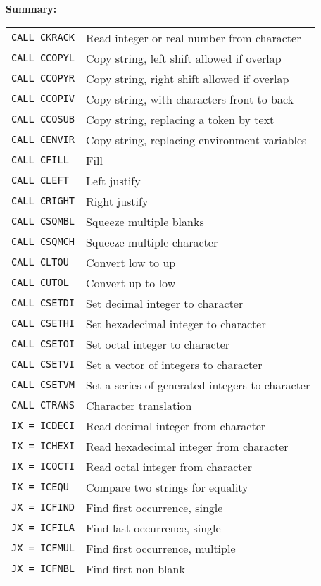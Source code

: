 {\bf Summary:}
\begin{tabular}[t]{l@{\qquad}l}
{\tt CALL CKRACK}  & Read integer or real number from character\\
{\tt CALL CCOPYL}  & Copy string, left shift allowed if overlap\\
{\tt CALL CCOPYR}  & Copy string, right shift allowed if overlap\\
{\tt CALL CCOPIV}  & Copy string, with characters front-to-back\\
{\tt CALL CCOSUB}  & Copy string, replacing a token by text\\
{\tt CALL CENVIR}  & Copy string, replacing environment variables\\
{\tt CALL CFILL}   & Fill\\
{\tt CALL CLEFT}   & Left justify\\
{\tt CALL CRIGHT}  & Right justify\\
{\tt CALL CSQMBL}  & Squeeze multiple blanks\\
{\tt CALL CSQMCH}  & Squeeze multiple character\\
{\tt CALL CLTOU}   & Convert low to up\\
{\tt CALL CUTOL}   & Convert up to low\\
{\tt CALL CSETDI}  & Set decimal integer to character\\
{\tt CALL CSETHI}  & Set hexadecimal integer to character\\
{\tt CALL CSETOI}  & Set octal integer to character\\
{\tt CALL CSETVI}  & Set a vector of integers to character\\
{\tt CALL CSETVM}  & Set a series of generated integers to character\\
{\tt CALL CTRANS}  & Character translation\\
{\tt IX = ICDECI}  & Read decimal integer from character\\
{\tt IX = ICHEXI}  & Read hexadecimal integer from character\\
{\tt IX = ICOCTI}  & Read octal integer from character\\
{\tt IX = ICEQU}   & Compare two strings for equality\\
{\tt JX = ICFIND}  & Find first occurrence, single\\
{\tt JX = ICFILA}  & Find last occurrence, single\\
{\tt JX = ICFMUL}  & Find first occurrence, multiple\\
{\tt JX = ICFNBL}  & Find first non-blank\\
\end{tabular}
